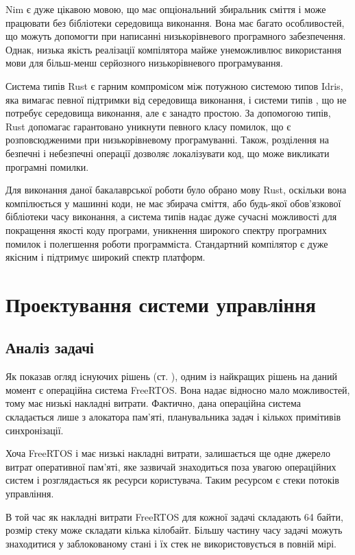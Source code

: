\documentclass[oneside,14pt,a4paper,final]{myextreport}
\begin{document}
Nim є дуже цікавою мовою, що має опціональний збиральник сміття і може працювати без бібліотеки середовища виконання. Вона має багато особливостей, що можуть допомогти при написанні низькорівневого програмного забезпечення. Однак, низька якість реалізації компілятора майже унеможливлює використання мови для більш-менш серйозного низькорівневого програмування.

Система типів Rust є гарним компромісом між потужною системою типов Idris, яка вимагає певної підтримки від середовища виконання, і системи типів \LangC{}, що не потребує середовища виконання, але є занадто простою. За допомогою типів, Rust допомагає гарантовано уникнути певного класу помилок, що є розповсюдженими при низькорівневому програмуванні. Також, розділення на безпечні і небезпечні операції дозволяє локалізувати код, що може викликати програмні помилки.

Для виконання даної бакалаврської роботи було обрано мову Rust, оскільки вона компілюється у машинні коди, не має збирача сміття, або будь-якої обов'язкової бібліотеки часу виконання, а система типів надає дуже сучасні можливості для покращення якості коду програми, уникнення широкого спектру програмних помилок і полегшення роботи программіста. Стандартний компілятор є дуже якісним і підтримує широкий спектр платформ.

\chapter{Проектування системи управління}
\section{Аналіз задачі}

Як показав огляд існуючих рішень (ст. \pageref{existing-solutions}), одним із найкращих рішень на даний момент є операційна система FreeRTOS. Вона надає відносно мало можливостей, тому має низькі накладні витрати. Фактично, дана операційна система складається лише з алокатора пам'яті, планувальника задач і кількох примітивів синхронізації.

Хоча FreeRTOS і має низькі накладні витрати, залишається ще одне джерело витрат оперативної пам'яті, яке зазвичай знаходиться поза увагою операційних систем і розглядається як ресурси користувача. Таким ресурсом є стеки потоків управління.

В той час як накладні витрати FreeRTOS для кожної задачі складають 64 байти, розмір стеку може складати кілька кілобайт. Більшу частину часу задачі можуть знаходитися у заблокованому стані і їх стек не використовується в повній мірі.
\end{document}
